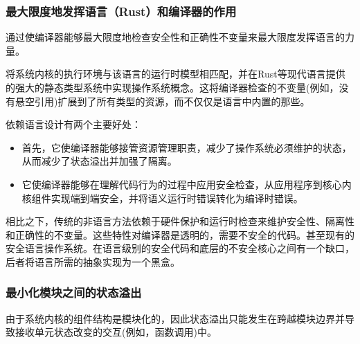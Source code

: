 \subsubsection{最大限度地发挥语言（Rust）和编译器的作用}
通过使编译器能够最大限度地检查安全性和正确性不变量来最大限度发挥语言的力量。

将系统内核的执行环境与该语言的运行时模型相匹配，并在Rust等现代语言提供的强大的静态类型系统中实现操作系统概念。这将编译器检查的不变量(例如，没有悬空引用)扩展到了所有类型的资源，而不仅仅是语言中内置的那些。

依赖语言设计有两个主要好处：

\begin{itemize}
    \item 首先，它使编译器能够接管资源管理职责，减少了操作系统必须维护的状态，从而减少了状态溢出并加强了隔离。
    \item 它使编译器能够在理解代码行为的过程中应用安全检查，从应用程序到核心内核组件实现端到端安全，并将语义运行时错误转化为编译时错误。
\end{itemize}

相比之下，传统的非语言方法依赖于硬件保护和运行时检查来维护安全性、隔离性和正确性的不变量。这些特性对编译器是透明的，需要不安全的代码。甚至现有的安全语言操作系统。在语言级别的安全代码和底层的不安全核心之间有一个缺口，后者将语言所需的抽象实现为一个黑盒。

\subsubsection{最小化模块之间的状态溢出}

由于系统内核的组件结构是模块化的，因此状态溢出只能发生在跨越模块边界并导致接收单元状态改变的交互(例如，函数调用)中。

